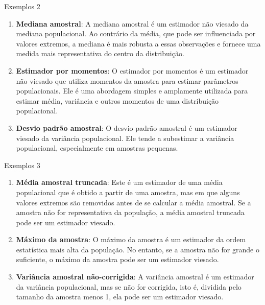 \documentclass[12pt]{beamer}
\begin{document}
\begin{frame}{Exemplos 2}
\begin{block}{}
\begin{enumerate}
 \conti
 \justifying
    \item \textbf{Mediana amostral}: A mediana amostral é um estimador não viesado da mediana populacional. Ao contrário da média, que pode ser influenciada por valores extremos, a mediana é mais robusta a essas observações e fornece uma medida mais representativa do centro da distribuição.

    \item \textbf{Estimador por momentos}: O estimador por momentos é um estimador não viesado que utiliza momentos da amostra para estimar parâmetros populacionais. Ele é uma abordagem simples e amplamente utilizada para estimar média, variância e outros momentos de uma distribuição populacional.

    \item \textbf{Desvio padrão amostral}: O desvio padrão amostral é um estimador viesado da variância populacional. Ele tende a subestimar a variância populacional, especialmente em amostras pequenas.
    \seti
\end{enumerate}
\end{block}
\end{frame}

\begin{frame}{Exemplos 3}
\begin{block}{}
\begin{enumerate}
 \conti
 \justifying
    \item \textbf{Média amostral truncada}: Este é um estimador de uma média populacional que é obtido a partir de uma amostra, mas em que alguns valores extremos são removidos antes de se calcular a média amostral. Se a amostra não for representativa da população, a média amostral truncada pode ser um estimador viesado.

    \item \textbf{Máximo da amostra}: O máximo da amostra é um estimador da ordem estatística mais alta da população. No entanto, se a amostra não for grande o suficiente, o máximo da amostra pode ser um estimador viesado.

    \item \textbf{Variância amostral não-corrigida}: A variância amostral é um estimador da variância populacional, mas se não for corrigida, isto é, dividida pelo tamanho da amostra menos 1, ela pode ser um estimador viesado.
\end{enumerate}
\end{block}
\end{frame}
\end{document}
